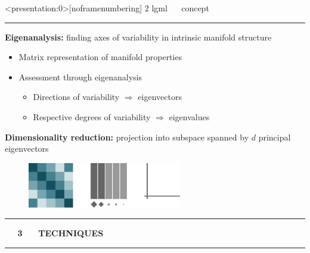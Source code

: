 \documentclass[11pt, compress, t, notes = noshow, xcolor = table, 
aspectratio = 1610]{beamer}
\newcommand{\highlight}[1]{\textcolor{highlightcol}{\textbf{#1}}}
\newcommand{\arritem}{\item[\highlight{$\rightarrow$}]}
\begin{document}

\LARGE
\begin{frame}<presentation:0>[noframenumbering]
{\textcolor{gray!90}{2 lgml} ~~ concept}
\normalsize
\vspace{-0.5cm}
\noindent \textcolor{gray!90}{\rule{\textwidth}{1pt}}
\smallskip

\textbf{Eigenanalysis:} finding axes of variability in intrinsic 
manifold structure

\begin{itemize}
  \arritem Matrix representation of manifold properties
  \arritem Assessment through eigenanalysis
  \begin{itemize}
    \arritem Directions of variability $\Rightarrow$ eigenvectors
    \arritem Respective degrees of variability $\Rightarrow$ eigenvalues
  \end{itemize}
\end{itemize}

\vspace{0.3cm}

\textbf{Dimensionality reduction:} projection into subspace 
spanned by $d$ principal eigenvectors

\vspace{0.3cm}

\begin{figure}[H]
  \raggedright
  \includegraphics[trim = 0 0 0 0, clip, %
    width = 0.6\textwidth]{figures/eigenanalysis}
\end{figure}

\end{frame}


\LARGE
\begin{frame}[noframenumbering]{\phantom{foo}}
\normalsize
\vspace{-0.5cm}
\noindent \textcolor{gray!90}{\rule{\textwidth}{1pt}}
\smallskip

\Huge
\hspace{0pt}
\vfill
\textbf{\highlight{~~ 3 ~~ TECHNIQUES}}
\vfill
\hspace{0pt}

\noindent \textcolor{gray!90}{\rule{\textwidth}{1pt}}

\end{frame}
\end{document}
